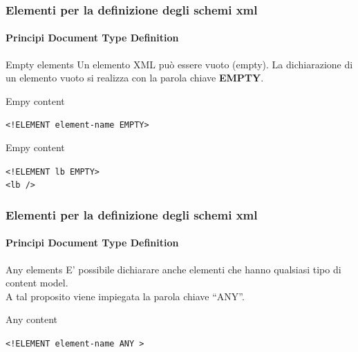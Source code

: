 \begin{frame}
    \frametitle{Elementi per la definizione degli schemi xml}
    \framesubtitle{Principi Document Type Definition}
    \addtocounter{nframe}{1}

    \begin{block}{Empty elements}
        Un elemento XML può essere vuoto (empty). La dichiarazione di un elemento vuoto si realizza con la parola chiave \textbf{EMPTY}.
    \end{block}

    \begin{block}{Empy content}
    \begin{center}\texttt{<!ELEMENT element-name EMPTY>}\end{center}
    \end{block}

    \begin{block}{Empy content}
        \begin{center}
            \texttt{<!ELEMENT lb EMPTY>}
            \\\texttt{<lb />}
        \end{center}
    \end{block}

\end{frame}


\begin{frame}
    \frametitle{Elementi per la definizione degli schemi xml}
    \framesubtitle{Principi Document Type Definition}
    \addtocounter{nframe}{1}

    \begin{block}{Any elements}
        E' possibile dichiarare anche elementi che hanno qualsiasi tipo di content model.
        \\ A tal proposito viene impiegata la parola chiave  ``ANY''.
    \end{block}

    \begin{block}{Any content}
    \begin{center}\texttt{<!ELEMENT element-name ANY >}\end{center}
    \end{block}
    
\end{frame}

